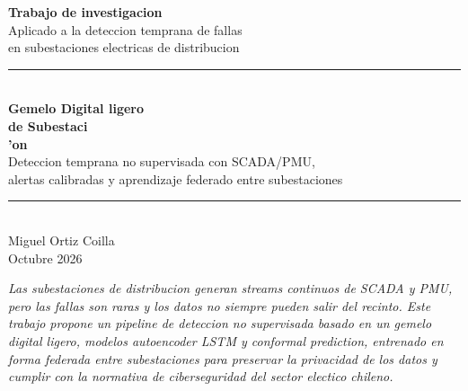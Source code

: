 \thispagestyle{empty}
\begin{titlepage}
  \begin{center}
    \vspace*{1.5cm}
    {\Large\textbf{Trabajo de investigacion}}\\[0.6cm]
    {\Large Aplicado a la deteccion temprana de fallas}\\
    {\Large en subestaciones electricas de distribucion}\\[1.5cm]

    \rule{0.85\textwidth}{0.5pt}\\[0.6cm]
    {\Huge\bfseries Gemelo Digital ligero\\ de Subestaci\\'on}\\[0.3cm]
    {\Large Deteccion temprana no supervisada con SCADA/PMU,\\
        alertas calibradas y aprendizaje federado entre subestaciones}\\[0.6cm]
    \rule{0.85\textwidth}{0.5pt}\\[1.5cm]

    {\Large Miguel Ortiz Coilla}\\[1cm]
    {\large Octubre 2026}\\[2cm]

    \begin{tcolorbox}[colback=blue!3,colframe=blue!40!black,width=0.78\textwidth]
      \centering\itshape\small
      Las subestaciones de distribucion generan streams continuos de SCADA y PMU,
      pero las fallas son raras y los datos no siempre pueden salir del recinto.
      Este trabajo propone un pipeline de deteccion no supervisada basado en un
      gemelo digital ligero, modelos autoencoder LSTM y \emph{conformal prediction},
      entrenado en forma federada entre subestaciones para preservar la privacidad
      de los datos y cumplir con la normativa de ciberseguridad del sector
      electico chileno.
    \end{tcolorbox}
  \end{center}
\end{titlepage}